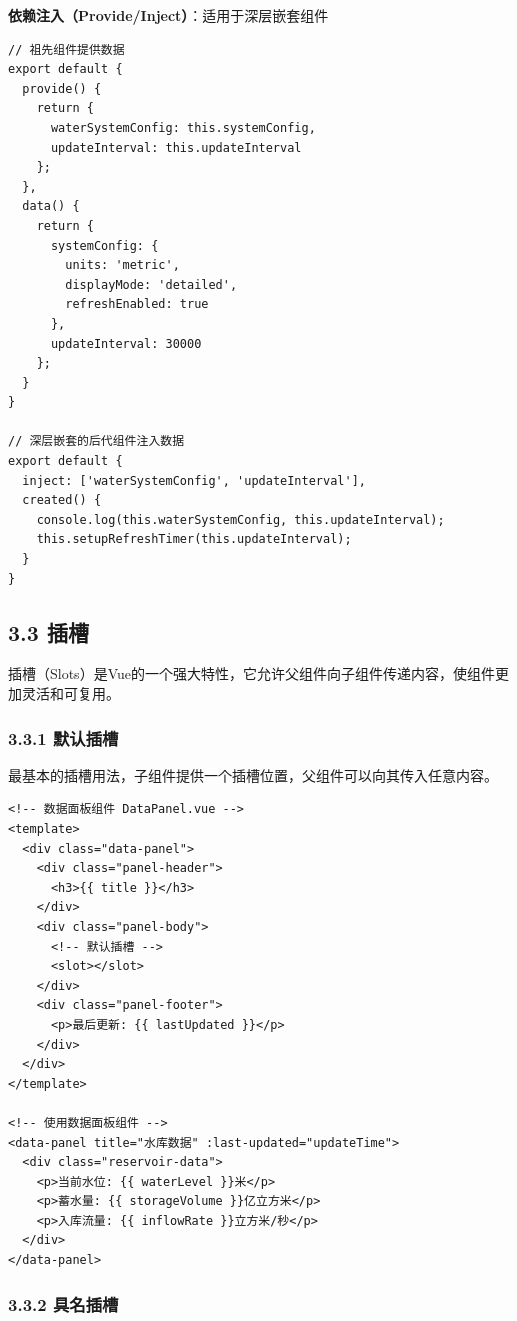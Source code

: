 \textbf{依赖注入（Provide/Inject）}：适用于深层嵌套组件

\begin{lstlisting}
// 祖先组件提供数据
export default {
  provide() {
    return {
      waterSystemConfig: this.systemConfig,
      updateInterval: this.updateInterval
    };
  },
  data() {
    return {
      systemConfig: {
        units: 'metric',
        displayMode: 'detailed',
        refreshEnabled: true
      },
      updateInterval: 30000
    };
  }
}

// 深层嵌套的后代组件注入数据
export default {
  inject: ['waterSystemConfig', 'updateInterval'],
  created() {
    console.log(this.waterSystemConfig, this.updateInterval);
    this.setupRefreshTimer(this.updateInterval);
  }
}
\end{lstlisting}

\subsection{3.3 插槽}\label{ux63d2ux69fd}

插槽（Slots）是Vue的一个强大特性，它允许父组件向子组件传递内容，使组件更加灵活和可复用。

\subsubsection{3.3.1 默认插槽}\label{ux9ed8ux8ba4ux63d2ux69fd}

最基本的插槽用法，子组件提供一个插槽位置，父组件可以向其传入任意内容。

\begin{lstlisting}
<!-- 数据面板组件 DataPanel.vue -->
<template>
  <div class="data-panel">
    <div class="panel-header">
      <h3>{{ title }}</h3>
    </div>
    <div class="panel-body">
      <!-- 默认插槽 -->
      <slot></slot>
    </div>
    <div class="panel-footer">
      <p>最后更新: {{ lastUpdated }}</p>
    </div>
  </div>
</template>

<!-- 使用数据面板组件 -->
<data-panel title="水库数据" :last-updated="updateTime">
  <div class="reservoir-data">
    <p>当前水位: {{ waterLevel }}米</p>
    <p>蓄水量: {{ storageVolume }}亿立方米</p>
    <p>入库流量: {{ inflowRate }}立方米/秒</p>
  </div>
</data-panel>
\end{lstlisting}

\subsubsection{3.3.2 具名插槽}\label{ux5177ux540dux63d2ux69fd}

